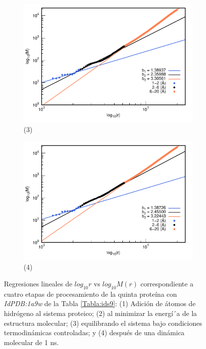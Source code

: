 \begin{figure}[H]
	\vspace{0cm} %
	
	\hspace{-0.3cm} 
	\begin{subfigure}{0.49\textwidth}
		\centering
		\includegraphics[width=\linewidth,page=1]{graphs/PDBs/1a9w/1a9wEq.pdf}
		\caption{(3)}
	\end{subfigure}
	\hspace{0.2cm}
	\begin{subfigure}{0.49\textwidth} %
		\centering
		\includegraphics[width=\linewidth,page=1]{graphs/PDBs/1a9w/1a9w1ns.pdf}
		\caption{(4)}
	\end{subfigure}
	\caption{Regresiones lineales de $log_{10}r$ vs $log_{10}M(r)$ correspondiente a cuatro etapas de procesamiento de la quinta prote\'{i}na con \textit{IdPDB:1a9w} de la Tabla \ref{Tabla:ids9}: (1) Adici\'{o}n de \'{a}tomos de hidr\'{o}geno al sistema proteico; (2) al minimizar la energ\'{i´}a de la estructura molecular; (3) equilibrando el sistema bajo condiciones termodin\'{a}micas controladas; y (4) despu\'{e}s de una din\'{a}mica molecular de 1 ns.}
	\label{fig:1a9w}
\end{figure}

